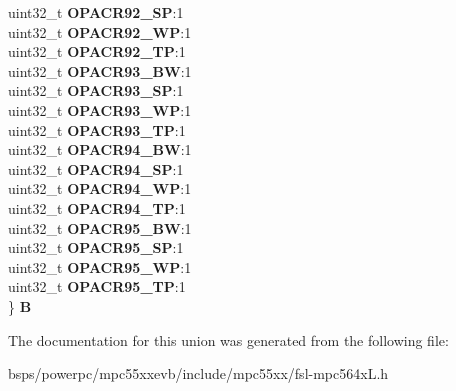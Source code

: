\begin{DoxyCompactItemize}
\begin{tabbing}
\>uint32\_t {\bfseries OPACR92\_SP}:1\\
\>uint32\_t {\bfseries OPACR92\_WP}:1\\
\>uint32\_t {\bfseries OPACR92\_TP}:1\\
\>uint32\_t {\bfseries OPACR93\_BW}:1\\
\>uint32\_t {\bfseries OPACR93\_SP}:1\\
\>uint32\_t {\bfseries OPACR93\_WP}:1\\
\>uint32\_t {\bfseries OPACR93\_TP}:1\\
\>uint32\_t {\bfseries OPACR94\_BW}:1\\
\>uint32\_t {\bfseries OPACR94\_SP}:1\\
\>uint32\_t {\bfseries OPACR94\_WP}:1\\
\>uint32\_t {\bfseries OPACR94\_TP}:1\\
\>uint32\_t {\bfseries OPACR95\_BW}:1\\
\>uint32\_t {\bfseries OPACR95\_SP}:1\\
\>uint32\_t {\bfseries OPACR95\_WP}:1\\
\>uint32\_t {\bfseries OPACR95\_TP}:1\\
\} {\bfseries B}\\

\end{tabbing}\end{DoxyCompactItemize}


The documentation for this union was generated from the following file\+:\begin{DoxyCompactItemize}
\item 
bsps/powerpc/mpc55xxevb/include/mpc55xx/fsl-\/mpc564x\+L.\+h\end{DoxyCompactItemize}
